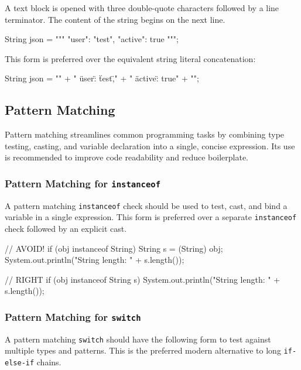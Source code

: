 \documentclass{article}
\begin{document}
A text block is opened with three double-quote characters followed by a line terminator. The content
of the string begins on the next line.

\begin{snippet}
String json = """
        {
          "user": "test",
          "active": true
        }
        """;
\end{snippet}

This form is preferred over the equivalent string literal concatenation:

\begin{snippet}
String json = "{\n"
        + "  \"user\": \"test\",\n"
        + "  \"active\": true\n"
        + "}\n";
\end{snippet}

\subsection{Pattern Matching}

Pattern matching streamlines common programming tasks by combining type testing, casting, and
variable declaration into a single, concise expression. Its use is recommended to improve code
readability and reduce boilerplate.

\subsubsection{Pattern Matching for \texttt{instanceof}}

A pattern matching \texttt{instanceof} check should be used to test, cast, and bind a variable in a
single expression. This form is preferred over a separate \texttt{instanceof} check followed by an
explicit cast.

\begin{snippet}
// AVOID!
if (obj instanceof String) {
    String s = (String) obj;
    System.out.println("String length: " + s.length());
}

// RIGHT
if (obj instanceof String s) {
    System.out.println("String length: " + s.length());
}
\end{snippet}

\subsubsection{Pattern Matching for \texttt{switch}}

A pattern matching \texttt{switch} should have the following form to test against multiple types
and patterns. This is the preferred modern alternative to long \texttt{if-else-if} chains.
\end{document}
